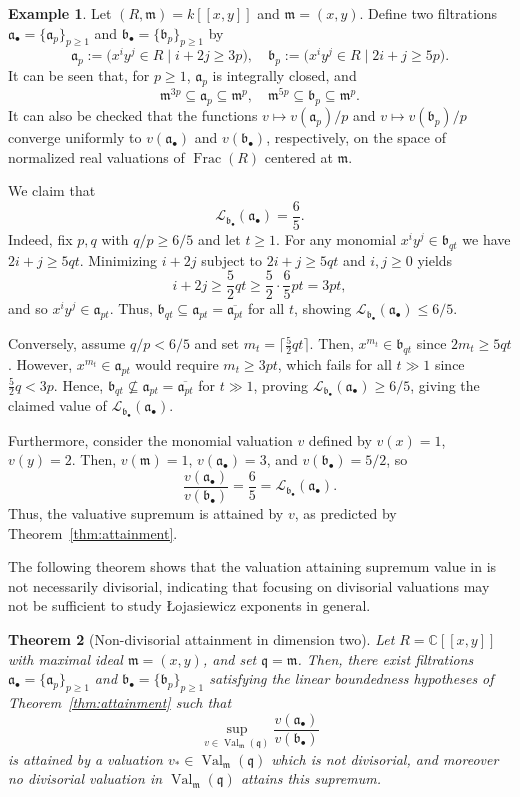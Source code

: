 \documentclass[12pt]{amsart}
\newcommand{\CC}{\mathbb{C}}
\newcommand{\m}{\mathfrak m}
\newcommand{\q}{\mathfrak q}
\renewcommand{\a}{\mathfrak{a}}
\renewcommand{\b}{\mathfrak{b}}
\newcommand{\Loj}{\mathcal{L}} %
\DeclareMathOperator{\Val}{Val}
\DeclareMathOperator{\Frac}{Frac}
\newcommand{\abul}{{\a_\bullet}}
\newcommand{\bbul}{{\b_\bullet}}
\theoremstyle{plain}
\newtheorem{theorem}{Theorem}[section]
\theoremstyle{definition}
\newtheorem{example}[theorem]{Example}
\numberwithin{equation}{section}
\begin{document}
	\begin{example}\label{ex:nonpower-linearly-bounded}
	Let $(R,\m)=k[[x,y]]$ and $\m = (x,y)$.
		Define two filtrations $\abul=\{\a_p\}_{p\ge1}$ and $\bbul=\{\b_p\}_{p\ge1}$ by
		\[
		\a_p:=\big(x^iy^j \in R \mid i+2j \ge 3p\big),
		\quad
		\b_p:=\big(x^iy^j \in R \mid 2i+j \ge 5p\big).
		\]
It can be seen that, for $p\ge1$, $\a_p$ is integrally closed, and
		\[
		\m^{3p}\subseteq \a_p \subseteq \m^{p},
		\quad
		\m^{5p}\subseteq \b_p \subseteq \m^{p}.
		\]
	It can also be checked that the functions $v \mapsto v(\a_p)/p$ and $v \mapsto v(\b_p)/p$ converge uniformly to $v(\abul)$ and $v(\bbul)$, respectively, on the space of normalized real valuations of $\Frac(R)$ centered at $\m$.
	
		We claim that
		\[
		\Loj_{\bbul}(\abul)=\frac{6}{5}.
		\]
Indeed, fix $p,q$ with $q/p\ge 6/5$ and let $t\ge1$.
		For any monomial $x^iy^j\in \b_{qt}$ we have $2i+j\ge 5qt$.
		Minimizing $i+2j$ subject to $2i+j\ge 5qt$ and $i,j\ge0$ yields
		\[
		i+2j \ge \frac{5}{2}qt \ge \frac{5}{2}\cdot\frac{6}{5}pt = 3pt,
		\]
		and so $x^iy^j\in \a_{pt}$.
		Thus, $\b_{qt}\subseteq \a_{pt} = \overline{\a_{pt}}$ for all $t$, showing $\Loj_{\bbul}(\abul)\le 6/5$.
		
Conversely, assume $q/p<6/5$ and set $m_t=\lceil\frac{5}{2}qt\rceil$.
		Then, $x^{m_t}\in \b_{qt}$ since $2m_t\ge 5qt$.
		However, $x^{m_t}\in \a_{pt}$ would require $m_t\ge 3pt$, which fails for all $t\gg1$
		since $\frac{5}{2}q<3p$.
		Hence, $\b_{qt}\nsubseteq \a_{pt} = \overline{\a_{pt}}$ for $t\gg1$, proving $\Loj_{\bbul}(\abul)\ge 6/5$, giving the claimed value of $\Loj_{\bbul}(\abul)$.
		
		Furthermore, consider the monomial valuation $v$ defined by $v(x)=1$, $v(y)=2$.
		Then, $v(\m)=1$, $v(\a_\bullet)=3$, and $v(\b_\bullet)=5/2$, so
		\[
		\frac{v(\a_\bullet)}{v(\b_\bullet)}=\frac{6}{5}=\Loj_{\bbul}(\abul).
		\]
		Thus, the valuative supremum is attained by $v$, as predicted by Theorem~\ref{thm:attainment}.
	\end{example}
	

The following theorem shows that the valuation attaining supremum value in  is not necessarily divisorial, indicating that focusing on divisorial valuations may not be sufficient to study \L{}ojasiewicz exponents in general.

\begin{theorem}[Non-divisorial attainment in dimension two]
	\label{thm:nondivisorial-attainment-final}
	Let $R=\CC[[x,y]]$ with maximal ideal $\m=(x,y)$, and set $\q=\m$.
	Then, there exist filtrations $\abul=\{\a_p\}_{p\ge1}$ and $\bbul=\{\b_p\}_{p\ge1}$
	satisfying the linear boundedness hypotheses of Theorem~\ref{thm:attainment}
	such that
	\[
	\sup_{v\in\Val_{\m}(\q)}\frac{v(\abul)}{v(\bbul)}
	\]
	is attained by a valuation $v_*\in\Val_{\m}(\q)$ which is \emph{not} divisorial,
	and moreover \emph{no divisorial valuation} in $\Val_{\m}(\q)$ attains this supremum.
\end{theorem}
\end{document}

